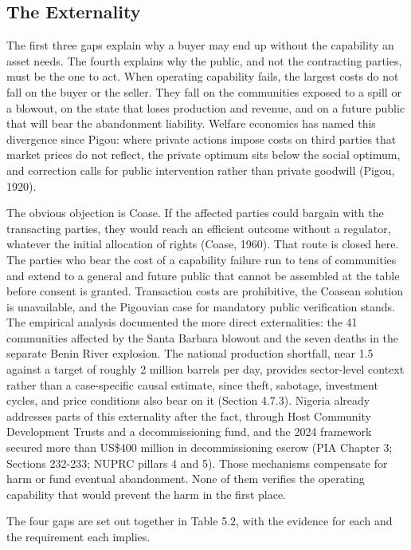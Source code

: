 \documentclass[twoside,fontset=lmodern]{mitthesis}
\begin{document}
\hypertarget{the-externality}{%
\subsection{The Externality}\label{the-externality}}

The first three gaps explain why a buyer may end up without the
capability an asset needs. The fourth explains why the public, and not
the contracting parties, must be the one to act. When operating
capability fails, the largest costs do not fall on the buyer or the
seller. They fall on the communities exposed to a spill or a blowout, on
the state that loses production and revenue, and on a future public that
will bear the abandonment liability. Welfare economics has named this
divergence since Pigou: where private actions impose costs on third
parties that market prices do not reflect, the private optimum sits
below the social optimum, and correction calls for public intervention
rather than private goodwill (Pigou, 1920).

The obvious objection is Coase. If the affected parties could bargain
with the transacting parties, they would reach an efficient outcome
without a regulator, whatever the initial allocation of rights (Coase,
1960). That route is closed here. The parties who bear the cost of a
capability failure run to tens of communities and extend to a general
and future public that cannot be assembled at the table before consent
is granted. Transaction costs are prohibitive, the Coasean solution is
unavailable, and the Pigouvian case for mandatory public verification
stands. The empirical analysis documented the more direct externalities:
the 41 communities affected by the Santa Barbara blowout and the seven
deaths in the separate Benin River explosion. The national production
shortfall, near 1.5 against a target of roughly 2 million barrels per
day, provides sector-level context rather than a case-specific causal
estimate, since theft, sabotage, investment cycles, and price conditions
also bear on it (Section 4.7.3). Nigeria already addresses parts of this
externality after the fact, through Host Community Development Trusts
and a decommissioning fund, and the 2024 framework secured more than
US\$400 million in decommissioning escrow (PIA Chapter 3; Sections
232-233; NUPRC pillars 4 and 5). Those mechanisms compensate for harm or
fund eventual abandonment. None of them verifies the operating
capability that would prevent the harm in the first place.

The four gaps are set out together in Table 5.2, with the evidence for
each and the requirement each implies.
\end{document}
